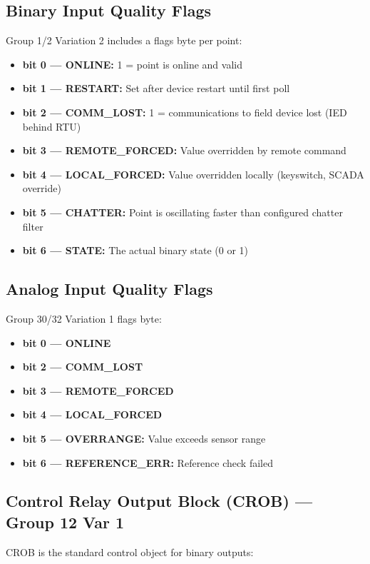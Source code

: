 \documentclass[11pt,twoside]{article}
\begin{document}
\subsection{Binary Input Quality Flags}

Group 1/2 Variation 2 includes a flags byte per point:
\begin{itemize}[noitemsep]
  \item \textbf{bit 0 — ONLINE:} 1 = point is online and valid
  \item \textbf{bit 1 — RESTART:} Set after device restart until first poll
  \item \textbf{bit 2 — COMM\_LOST:} 1 = communications to field device lost (IED behind RTU)
  \item \textbf{bit 3 — REMOTE\_FORCED:} Value overridden by remote command
  \item \textbf{bit 4 — LOCAL\_FORCED:} Value overridden locally (keyswitch, SCADA override)
  \item \textbf{bit 5 — CHATTER:} Point is oscillating faster than configured chatter filter
  \item \textbf{bit 6 — STATE:} The actual binary state (0 or 1)
\end{itemize}

\subsection{Analog Input Quality Flags}

Group 30/32 Variation 1 flags byte:
\begin{itemize}[noitemsep]
  \item \textbf{bit 0 — ONLINE}
  \item \textbf{bit 2 — COMM\_LOST}
  \item \textbf{bit 3 — REMOTE\_FORCED}
  \item \textbf{bit 4 — LOCAL\_FORCED}
  \item \textbf{bit 5 — OVERRANGE:} Value exceeds sensor range
  \item \textbf{bit 6 — REFERENCE\_ERR:} Reference check failed
\end{itemize}

\subsection{Control Relay Output Block (CROB) --- Group 12 Var 1}

CROB is the standard control object for binary outputs:
\end{document}
